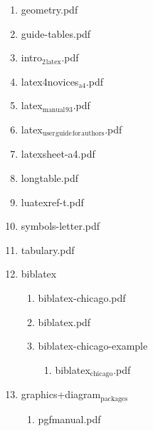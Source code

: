 \documentclass[11pt]{article}
\begin{document}
\begin{enumerate}
\begin{enumerate}
\item geometry.pdf
\label{sec-1-1-1-1-46-9-3}

\item guide-tables.pdf
\label{sec-1-1-1-1-46-9-4}

\item intro$_{\text{2}}$$_{\text{latex}}$.pdf
\label{sec-1-1-1-1-46-9-5}

\item latex4novices$_{\text{a4}}$.pdf
\label{sec-1-1-1-1-46-9-6}

\item latex$_{\text{manual}}$$_{\text{93}}$.pdf
\label{sec-1-1-1-1-46-9-7}

\item latex$_{\text{user}}$$_{\text{guide}}$$_{\text{for}}$$_{\text{authors}}$.pdf
\label{sec-1-1-1-1-46-9-8}

\item latexsheet-a4.pdf
\label{sec-1-1-1-1-46-9-9}

\item longtable.pdf
\label{sec-1-1-1-1-46-9-10}

\item luatexref-t.pdf
\label{sec-1-1-1-1-46-9-11}

\item symbols-letter.pdf
\label{sec-1-1-1-1-46-9-12}

\item tabulary.pdf
\label{sec-1-1-1-1-46-9-13}

\item biblatex
\label{sec-1-1-1-1-46-9-14}
\begin{enumerate}
\item biblatex-chicago.pdf
\label{sec-1-1-1-1-46-9-14-1}

\item biblatex.pdf
\label{sec-1-1-1-1-46-9-14-2}

\item biblatex-chicago-example
\label{sec-1-1-1-1-46-9-14-3}
\begin{enumerate}
\item biblatex$_{\text{chicago}}$.pdf
\label{sec-1-1-1-1-46-9-14-3-1}
\end{enumerate}
\end{enumerate}

\item graphics+diagram$_{\text{packages}}$
\label{sec-1-1-1-1-46-9-15}
\begin{enumerate}
\item pgfmanual.pdf
\label{sec-1-1-1-1-46-9-15-1}


\end{enumerate}
\end{enumerate}
\end{enumerate}
\end{document}
